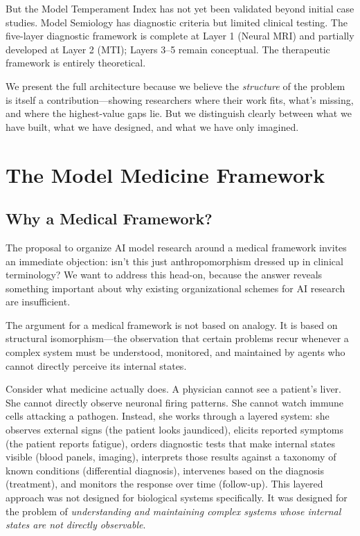 \documentclass[11pt]{article}
\begin{document}
But the Model Temperament Index has not yet been validated beyond initial case studies. Model Semiology has diagnostic criteria but limited clinical testing. The five-layer diagnostic framework is complete at Layer 1 (Neural MRI) and partially developed at Layer 2 (MTI); Layers 3--5 remain conceptual. The therapeutic framework is entirely theoretical.

We present the full architecture because we believe the \emph{structure} of the problem is itself a contribution---showing researchers where their work fits, what's missing, and where the highest-value gaps lie. But we distinguish clearly between what we have built, what we have designed, and what we have only imagined.

\section{The Model Medicine Framework}

\subsection{Why a Medical Framework?}

The proposal to organize AI model research around a medical framework invites an immediate objection: isn't this just anthropomorphism dressed up in clinical terminology? We want to address this head-on, because the answer reveals something important about why existing organizational schemes for AI research are insufficient.

The argument for a medical framework is not based on analogy. It is based on structural isomorphism---the observation that certain problems recur whenever a complex system must be understood, monitored, and maintained by agents who cannot directly perceive its internal states.

Consider what medicine actually does. A physician cannot see a patient's liver. She cannot directly observe neuronal firing patterns. She cannot watch immune cells attacking a pathogen. Instead, she works through a layered system: she observes external signs (the patient looks jaundiced), elicits reported symptoms (the patient reports fatigue), orders diagnostic tests that make internal states visible (blood panels, imaging), interprets those results against a taxonomy of known conditions (differential diagnosis), intervenes based on the diagnosis (treatment), and monitors the response over time (follow-up). This layered approach was not designed for biological systems specifically. It was designed for the problem of \emph{understanding and maintaining complex systems whose internal states are not directly observable}.
\end{document}
